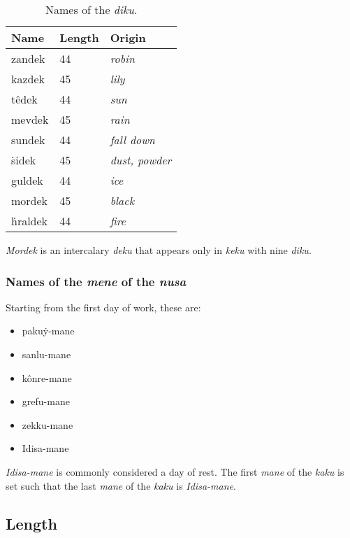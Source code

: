 \documentclass{book}
\begin{document}
\begin{table}[h]
    \caption{Names of the \emph{diku}.}
    \centering
    \begin{tabu} to \linewidth {|l|l|X|}
        \hline
        Name & Length & Origin \\
        \hline
        zandek & 44 &  \emph{robin} \\
        kazdek & 45 &  \emph{lily} \\
        têdek & 44 &  \emph{sun} \\
        mevdek & 45 &  \emph{rain} \\
        sundek & 44 &  \emph{fall down} \\
        ṡidek & 45 &  \emph{dust, powder} \\
        guldek & 44 &  \emph{ice} \\
        mordek & 45 &  \emph{black} \\
        ḣraldek & 44 &  \emph{fire} \\
        \hline
    \end{tabu}
\end{table}

\emph{Mordek} is an intercalary \emph{deku} that appears only in \emph{keku} with nine \emph{diku}.

\subsubsection{Names of the \emph{mene} of the \emph{nusa}}

Starting from the first day of work, these are:

\begin{itemize}
    \item pakuẏ-mane
    \item sanlu-mane
    \item kônre-mane
    \item grefu-mane
    \item zekku-mane
    \item Idisa-mane
\end{itemize}

\emph{Idisa-mane} is commonly considered a day of rest. The first \emph{mane} of the \emph{kaku} is set such that the last \emph{mane} of the \emph{kaku} is \emph{Idisa-mane}.

\newpage
\subsection{Length}
\end{document}
